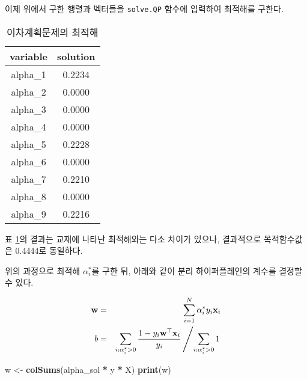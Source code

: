 \documentclass[]{book}
\newenvironment{Shaded}{\begin{snugshade}}{\end{snugshade}}
\newcommand{\KeywordTok}[1]{\textcolor[rgb]{0.13,0.29,0.53}{\textbf{#1}}}
\newcommand{\NormalTok}[1]{#1}
\newcommand{\OperatorTok}[1]{\textcolor[rgb]{0.81,0.36,0.00}{\textbf{#1}}}
\newcommand{\StringTok}[1]{\textcolor[rgb]{0.31,0.60,0.02}{#1}}
\begin{document}
이제 위에서 구한 행렬과 벡터들을 \texttt{solve.QP} 함수에 입력하여 최적해를 구한다.

\begin{Shaded}
\end{Shaded}

\begin{table}[t]

\caption{\label{tab:svm-separable-alpha}이차계획문제의 최적해}
\centering
\begin{tabular}{cc}
\toprule
variable & solution\\
\midrule
alpha\_1 & 0.2234\\
alpha\_2 & 0.0000\\
alpha\_3 & 0.0000\\
alpha\_4 & 0.0000\\
alpha\_5 & 0.2228\\
\addlinespace
alpha\_6 & 0.0000\\
alpha\_7 & 0.2210\\
alpha\_8 & 0.0000\\
alpha\_9 & 0.2216\\
\bottomrule
\end{tabular}
\end{table}

표 \ref{tab:svm-separable-alpha}의 결과는 교재\citep{jun2012datamining}에 나타난 최적해와는 다소 차이가 있으나, 결과적으로 목적함수값은 0.4444로 동일하다.

위의 과정으로 최적해 \(\alpha_{i}^{*}\)를 구한 뒤, 아래와 같이 분리 하이퍼플레인의 계수를 결정할 수 있다.

\begin{eqnarray*}
\mathbf{w} &=& \sum_{i = 1}^{N} \alpha_{i}^{*} y_{i} \mathbf{x}_{i}\\
b &=& \sum_{i: \alpha_{i}^{*} > 0} \frac{1 - y_{i} \mathbf{w}^{\top} \mathbf{x}_{i}}{y_{i}} \left/ \sum_{i: \alpha_{i}^{*} > 0} 1 \right. 
\end{eqnarray*}

\begin{Shaded}
\begin{Highlighting}[]
\NormalTok{w <-}\StringTok{ }\KeywordTok{colSums}\NormalTok{(alpha_sol }\OperatorTok{*}\StringTok{ }\NormalTok{y }\OperatorTok{*}\StringTok{ }\NormalTok{X)}
\KeywordTok{print}\NormalTok{(w)}
\end{Highlighting}
\end{Shaded}
\end{document}

